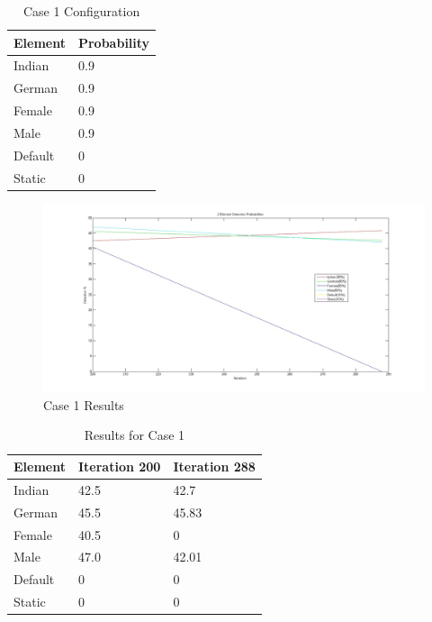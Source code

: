 \documentclass[fleqn,12pt]{SelfArx} %
\begin{document}
\begin{table}[h!]
	\begin{center}
    \begin{tabular}{| l | l |}
    \hline
    Element & Probability \\ \hline
    Indian & 0.9\\ \hline
    German & 0.9\\ \hline
    Female & 0.9\\ \hline
    Male & 0.9\\ \hline
    Default & 0\\ \hline
    Static & 0\\
    \hline
    \end{tabular}
    \caption{Case 1 Configuration}
	\label{table:config9}
    \end{center}
\end{table}
\begin{figure}[h!]
	\includegraphics[width=\linewidth]{2_element.jpg}
    \caption{Case 1 Results}
    \label{fig:case1results}
\end{figure}
\begin{table}[h!]
	\begin{center}
    \begin{tabular}{| l | l | l |}
    \hline
    Element & Iteration 200 & Iteration 288 \\ \hline
    Indian & 42.5 & 42.7\\ \hline
    German & 45.5 & 45.83\\ \hline
    Female & 40.5 & 0\\ \hline
    Male & 47.0 & 42.01\\ \hline
    Default & 0 & 0\\ \hline
    Static & 0 & 0\\
    \hline
    \end{tabular}
    \caption{Results for Case 1}
	\label{table:results}
    \end{center}
\end{table}
 
\end{document}
